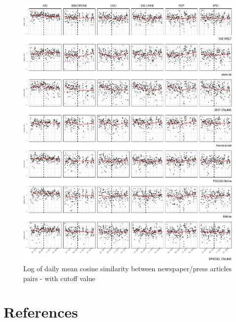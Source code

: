 \documentclass[
]{article}
\begin{document}
\begin{figure}

{\centering \includegraphics[width=1\linewidth]{main_text_files/figure-latex/Daily mean cosine similarity - cutoff value-1} 

}

\caption{Log of daily mean cosine similarity between newspaper/press articles pairs - with cutoff value \label{fig:mean_cosine_sim_rd}}\label{fig:Daily mean cosine similarity - cutoff value}
\end{figure}

\newpage

\hypertarget{references}{%
\section*{References}\label{references}}
\end{document}
